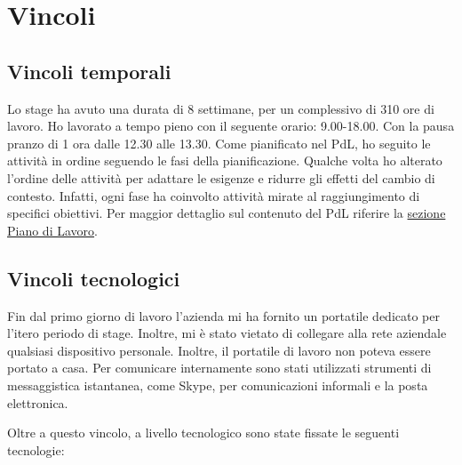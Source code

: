 \section{Vincoli}
\subsection{Vincoli temporali}
Lo stage ha avuto una durata di 8 settimane, per un complessivo di 310 ore di 
lavoro. Ho lavorato a tempo pieno con il seguente orario: 9.00-18.00. Con la 
pausa pranzo di 1 ora dalle 12.30 alle 13.30. Come pianificato nel PdL,  ho 
seguito le attività in ordine seguendo le fasi della pianificazione. Qualche 
volta ho alterato l'ordine delle attività per adattare le esigenze e ridurre 
gli effetti del cambio di contesto.  Infatti, ogni fase ha coinvolto attività 
mirate al raggiungimento di specifici obiettivi. Per maggior dettaglio sul 
contenuto del PdL riferire la \hyperref[sec:piano-di-lavoro]{sezione Piano di 
Lavoro}.

\subsection{Vincoli tecnologici}

Fin dal primo giorno di lavoro l'azienda mi ha fornito un portatile dedicato 
per l'itero periodo di stage. Inoltre, mi è stato vietato di collegare alla 
rete aziendale qualsiasi dispositivo personale. Inoltre, il portatile di lavoro 
non poteva essere portato a casa.
Per comunicare internamente sono stati utilizzati strumenti di messaggistica 
istantanea, come Skype, per comunicazioni informali e la posta elettronica.

Oltre a questo vincolo, a livello tecnologico sono state fissate le seguenti 
tecnologie:

